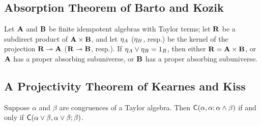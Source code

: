 \subsection{Absorption Theorem of Barto and Kozik}
\begin{theorem}
\label{thm:absorption}
Let $\mathbf{A}$ and $\mathbf{B}$ be finite
idempotent algebras with Taylor terms; let $\mathbf{R}$ be a subdirect product of
$\mathbf{A} \times \mathbf{B}$, and let $\eta_A$ ($\eta_B$, resp.) be the kernel of the
projection $\mathbf{R} \twoheadrightarrow \mathbf{A}$ ($\mathbf{R} \twoheadrightarrow \mathbf{B}$, resp.).
If $\eta_A \vee \eta_B = 1_R$, then either $\mathbf{R} = \mathbf{A} \times \mathbf{B}$, or
$\mathbf{A}$ has a proper absorbing subuniverse, or $\mathbf{B}$ has a proper absorbing subuniverse.
\end{theorem}

\subsection{A Projectivity Theorem of Kearnes and Kiss}
  \begin{theorem} 
    \label{thm:kearnes-kiss-3.27}
    Suppose $\alpha$ and $\beta$ are congruences of a Taylor algebra. Then
    $\mathsf{C}(\alpha,  \alpha;  \alpha \wedge \beta)$ if and only if
    $\mathsf{C}(\alpha \vee \beta,  \alpha \vee \beta;  \beta)$.
  \end{theorem}



